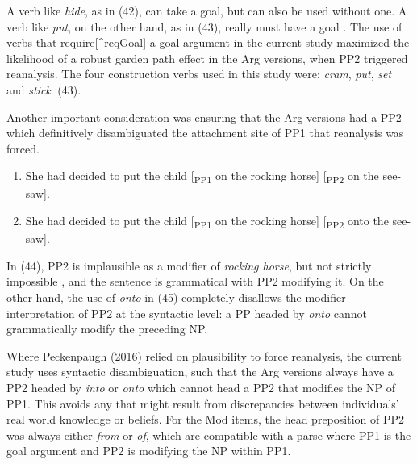 \documentclass[12pt,oneside]{book}
\providecommand{\tightlist}{%
  \setlength{\itemsep}{0pt}\setlength{\parskip}{0pt}}
\begin{document}
A verb like \emph{hide}, as in (42), can take a goal, but can also be used without one. A verb like \emph{put}, on the other hand, as in (43), really must have a goal . The use of verbs that require{[}\^{}reqGoal{]} a goal argument in the current study maximized the likelihood of a robust garden path effect in the Arg versions, when PP2 triggered reanalysis. The four construction verbs used in this study were: \emph{cram}, \emph{put}, \emph{set} and \emph{stick}.  (43).

Another important consideration was ensuring that the Arg versions had a PP2 which definitively disambiguated the attachment site of PP1  that reanalysis was forced.

\begin{enumerate}
\def\labelenumi{(\arabic{enumi})}
\setcounter{enumi}{43}
\tightlist
\item
  She had decided to put the child {[}\textsubscript{PP1} on the rocking horse{]} {[}\textsubscript{PP2} on the see-saw{]}.
\item
  She had decided to put the child {[}\textsubscript{PP1} on the rocking horse{]} {[}\textsubscript{PP2} onto the see-saw{]}.
\end{enumerate}

In (44), PP2 is implausible as a modifier of \emph{rocking horse}, but not strictly impossible , and the sentence is grammatical with PP2 modifying it. On the other hand, the use of \emph{onto} in (45) completely disallows the modifier interpretation of PP2 at the syntactic level: a PP headed by \emph{onto} cannot grammatically modify the preceding NP.

Where Peckenpaugh (2016) relied on plausibility to force reanalysis, the current study uses syntactic disambiguation, such that the Arg versions always have a PP2 headed by \emph{into} or \emph{onto} which cannot head a PP2 that modifies the NP of PP1. This avoids any  that might result from discrepancies between individuals' real world knowledge or beliefs. For the Mod items, the head preposition of PP2 was always either \emph{from} or \emph{of}, which are compatible with a parse where PP1 is the goal argument and PP2 is modifying the NP within PP1.
\end{document}
